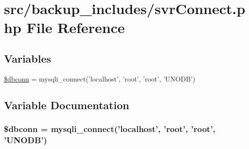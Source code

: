 \hypertarget{backup__includes_2svrConnect_8php}{\section{src/backup\-\_\-includes/svr\-Connect.php \-File \-Reference}
\label{backup__includes_2svrConnect_8php}
}
\subsection*{\-Variables}
\begin{DoxyCompactItemize}
\item 
\hyperlink{backup__includes_2svrConnect_8php_aefbfdbdc7b698d2c2220f869fc668040}{\$dbconn} = mysqli\-\_\-connect('localhost', 'root', 'root', '\-U\-N\-O\-D\-B')
\end{DoxyCompactItemize}


\subsection{\-Variable \-Documentation}
\hypertarget{backup__includes_2svrConnect_8php_aefbfdbdc7b698d2c2220f869fc668040}{
\subsubsection[{\$dbconn}]{\setlength{\rightskip}{0pt plus 5cm}\$dbconn = mysqli\-\_\-connect('localhost', 'root', 'root', '\-U\-N\-O\-D\-B')}}\label{backup__includes_2svrConnect_8php_aefbfdbdc7b698d2c2220f869fc668040}
